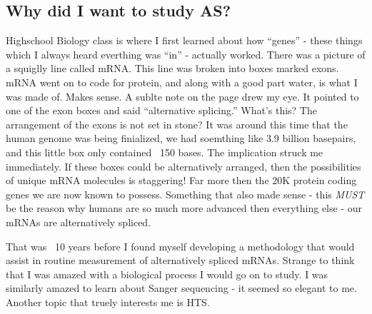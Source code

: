   \subsection{Why did I want to study AS?}

    Highschool Biology class is where I first learned about how ``genes'' - these things which I always heard everthing was ``in'' - actually worked.  There was a picture of a squiglly line called mRNA. This line was broken into boxes marked exons.  mRNA went on to code for protein, and along with a good part water, is what I was made of. Makes sense. A sublte note on the page drew my eye. It pointed to one of the exon boxes and said ``alternative splicing.'' What's this? The arrangement of the exons is not set in stone? It was around this time that the human genome was being finialized, we had soemthing like 3.9 billion basepairs, and this little box only contained ~150 bases. The implication struck me immediately. If these boxes could be alternatively arranged, then the possibilities of unique mRNA molecules is staggering! Far more then the 20K protein coding genes we are now known to possess. Something that also made sense - this \textit{MUST} be the reason why humans are so much more advanced then everything else - our mRNAs are alternatively spliced.

    That was ~10 years before I found myself developing a methodology that would assist in routine measurement of alternatively spliced mRNAs. Strange to think that I was amazed with a biological process I would go on to study. I was similarly amazed to learn about Sanger sequencing - it seemed so elegant to me. Another topic that truely interests me is HTS.